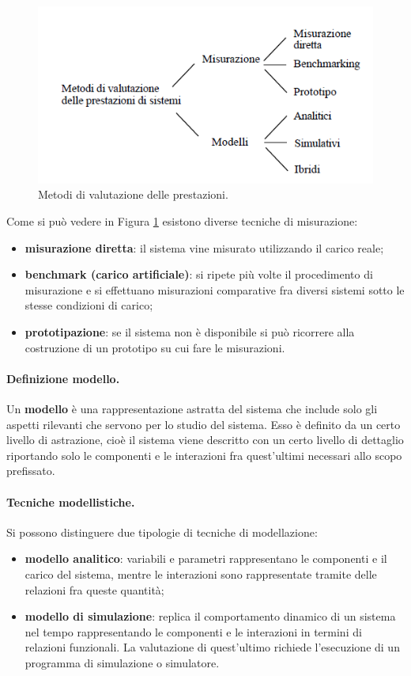 \begin{figure}[H]
	\centering
    \includegraphics[width=15cm, keepaspectratio]{img/prestazioni.png}
	\caption{Metodi di valutazione delle prestazioni.}\label{fig:prestazioni}
\end{figure}
Come si può vedere in Figura \ref{fig:prestazioni} esistono diverse tecniche di misurazione:
\begin{itemize}
    \item \textbf{misurazione diretta}: il sistema vine misurato utilizzando il carico reale;
    \item \textbf{benchmark (carico artificiale)}: si ripete più volte il procedimento di misurazione e si effettuano misurazioni comparative fra diversi sistemi sotto le stesse condizioni di carico;
    \item \textbf{prototipazione}: se il sistema non è disponibile si può ricorrere alla costruzione di un prototipo su cui fare le misurazioni.
\end{itemize}


\paragraph{Definizione modello.}Un \textbf{modello} è una rappresentazione astratta del sistema che include solo gli aspetti rilevanti che servono per lo studio del sistema. Esso è definito da un certo livello di astrazione, cioè il sistema viene descritto con un certo livello di dettaglio riportando solo le componenti e le interazioni fra quest'ultimi necessari allo scopo prefissato.
\paragraph{Tecniche modellistiche.}
Si possono distinguere due tipologie di tecniche di modellazione:
\begin{itemize}
    \item \textbf{modello analitico}: variabili e parametri rappresentano le componenti e il carico del sistema, mentre le interazioni sono rappresentate tramite delle relazioni fra queste quantità;
    \item \textbf{modello di simulazione}: replica il comportamento dinamico di un sistema nel tempo rappresentando le componenti e le interazioni in termini di relazioni funzionali. La valutazione di quest'ultimo richiede l'esecuzione di un programma di simulazione o simulatore.
\end{itemize}

